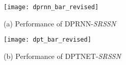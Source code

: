 \begin{figure*}
  \centering
  \begin{minipage}[b]{0.48\linewidth}
    \centering
    \texttt{[image: dprnn\_bar\_revised]}
    \centerline{(a) Performance of DPRNN-\emph{SRSSN}}\medskip
  \end{minipage}
  \hspace{0.01\linewidth}
  \begin{minipage}[b]{0.48\linewidth}
    \centering
    \texttt{[image: dpt\_bar\_revised]}
    \centerline{(b) Performance of DPTNET-\emph{SRSSN}}\medskip
  \end{minipage}
  \caption{}
  \label{fig:ablation_groups}
\end{figure*}

\begin{comment}
\begin{table*}
\centering
  \caption{Performance of eight variants of our SRSSN in terms of $\Delta$SI-SNR (dB) and $\Delta$SDR (dB) for ablation study. }
\label{tab:ablation}
  \setlength{\tabcolsep}{1.2pt} \begin{tabular}
  {l p{7em}<{\centering} p{10em}<{\centering} p{6em}<{\centering} p{5em}<{\centering} p{5em}<{\centering} p{5em}<{\centering} p{5em}<{\centering}}
  \toprule
  \multirow{2}{*}{\centering Method} & Space order & Parameters of encoder & \multirow{2}{*}{\centering Model size} & \multicolumn{2}{c}{DPRNN} & \multicolumn{2}{c}{DPTNET} \\
  & ($\mathcal{H}^c$ \& $\mathcal{H}^r$) & ($\mathcal{E}^c$ \& $\mathcal{E}^r$) & & $\Delta$SI-SNR & $\Delta$SDR & $\Delta$SI-SNR & $\Delta$SDR\\
  \midrule
  \midrule
  \textbf{Base model} & low \& - & 4k \& - & - & 17.8 & 18.1 & 18.3 & 18.6 \\
  \midrule
  \textbf{Base model-expanded} & low \& - & 16k \& - & - & 17.8 & 18.1 & 18.2 & 18.5 \\
  \midrule
  \textbf{Iterative} & low \& low & 4k \& 4k & - & 18.3 & 18.5 & 19.2 & 19.5 \\ 
  \midrule
  \textbf{High-order} & high \& - & - \& - & - & 19.1 & 19.3 & 19.0 & 19.2 \\
  \midrule
  \textbf{SRSSN-1D} & low \& low & 4k \& 131k & - & 19.3 & 19.5 & 19.7 & 19.9 \\
  \midrule
  \textbf{SRSSN-1D-expanded} & low \& low & 4k \& 524k & - & 19.5 & 19.7 & 20.0 & 20.2 \\
  \midrule
  \textbf{SRSSN-$\mathcal{L}^r$} & high \& high & 4k \& 32k  & - & 18.1 & 18.3 & 18.7 & 18.9 \\ 
  \midrule
  \textbf{SRSSN} & high \& high & 4k \& 32k & - & 20.0 & 20.2 & 20.4 & 20.6 \\ 
  \midrule
  \end{tabular} 
\end{table*}
\end{comment}

